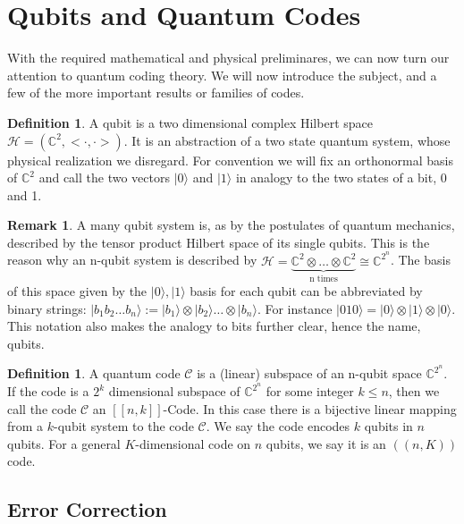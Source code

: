 \documentclass[12pt,a4paper,BCOR15mm,twoside,DIV12]{article}
\def\C{\mathbb{C}}
\theoremstyle{definition}
\newtheorem{rem}[Satz]{Remark}
\newtheorem{defn}[Satz]{Definition}
\begin{document}
\clearpage \newpage
\section{Qubits and Quantum Codes}

With the required mathematical and physical preliminares, we can now turn our attention to quantum coding theory. We will now introduce the subject, and a few of the more important results or families of codes.

\begin{defn}
A qubit is a two dimensional complex Hilbert space $\mathcal{H} = (\C^2, < \cdot , \cdot >)$. It is an abstraction of a two state quantum system, whose physical realization we disregard. For convention we will fix an orthonormal basis of $\C^2$ and call the two vectors $|0\rangle$ and $|1\rangle$ in analogy to the two states of a bit, 0 and 1. 
\end{defn}

\begin{rem}
A many qubit system is, as by the postulates of quantum mechanics, described by the tensor product Hilbert space of its single qubits. This is the reason why an n-qubit system is described by $\mathcal{H} = \underbrace{\C^2 \otimes \ldots \otimes \C^2}_\text{n times} \cong \C^{2^n}$. The basis of this space given by the $|0\rangle , |1\rangle$ basis for each qubit can be abbreviated by binary strings: $ | b_1 b_2 \ldots b_n \rangle := |b_1 \rangle \otimes | b_2 \rangle \ldots \otimes |b_n \rangle$. For instance $ |010\rangle = | 0 \rangle \otimes |1 \rangle \otimes |0 \rangle$. This notation also makes the analogy to bits further clear, hence the name, qubits. 
\end{rem}

\begin{defn}
A quantum code $\mathcal{C}$ is a (linear) subspace of an n-qubit space $\C^{2^n}$. If the code is a $2^k$ dimensional subspace of $\C^{2^n}$ for some integer $k \leq n$, then we call the code $\mathcal{C}$ an $[[n,k]]$-Code. In this case there is a bijective linear mapping from a $k$-qubit system to the code $\mathcal{C}$. We say the code encodes $k$ qubits in $n$ qubits. For a general $K$-dimensional code on $n$ qubits, we say it is an $((n,K))$ code.
\end{defn}


\subsection{Error Correction}
\end{document}
